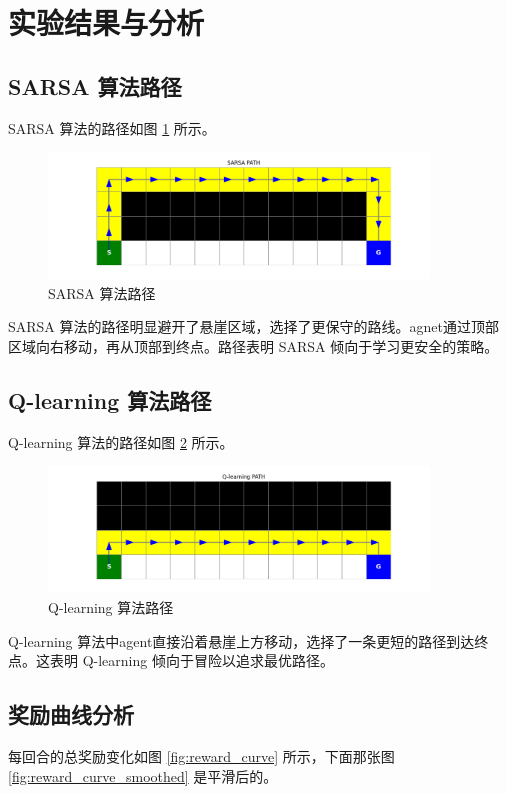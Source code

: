 \documentclass{article}
\begin{document}
\section{实验结果与分析}
\subsection{SARSA 算法路径}
SARSA 算法的路径如图 \ref{fig:sarsa_path} 所示。

\begin{figure}[h!]
    \centering
    \includegraphics[width=0.9\textwidth]{sarsa_path.png}
    \caption{SARSA 算法路径}
    \label{fig:sarsa_path}
\end{figure}

SARSA 算法的路径明显避开了悬崖区域，选择了更保守的路线。agnet通过顶部区域向右移动，再从顶部到终点。路径表明 SARSA 倾向于学习更安全的策略。

\subsection{Q-learning 算法路径}
Q-learning 算法的路径如图 \ref{fig:qlearning_path} 所示。

\begin{figure}[h!]
    \centering
    \includegraphics[width=0.9\textwidth]{qlearning_path.png}
    \caption{Q-learning 算法路径}
    \label{fig:qlearning_path}
\end{figure}

Q-learning 算法中agent直接沿着悬崖上方移动，选择了一条更短的路径到达终点。这表明 Q-learning 倾向于冒险以追求最优路径。

\subsection{奖励曲线分析}
每回合的总奖励变化如图 \ref{fig:reward_curve} 所示，下面那张图 \ref{fig:reward_curve_smoothed} 是平滑后的。
\end{document}
